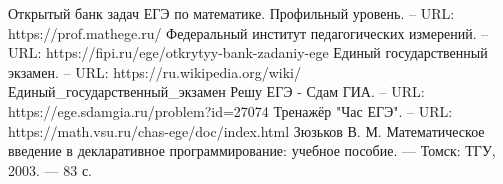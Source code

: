 \begin{thebibliography}{6}
	Открытый банк задач ЕГЭ по математике. Профильный уровень. – URL:  https://prof.mathege.ru/
	Федеральный институт педагогических измерений. – URL:  https://fipi.ru/ege/otkrytyy-bank-zadaniy-ege
	 Единый государственный экзамен. – URL:  https://ru.wikipedia.org/wiki/Единый\_государственный\_экзамен
	Решу ЕГЭ - Сдам ГИА. – URL: https://ege.sdamgia.ru/problem?id=27074
	 Тренажёр "Час ЕГЭ". – URL: https://math.vsu.ru/chas-ege/doc/index.html
	 Зюзьков В. М. Математическое введение в декларативное программирование: учебное пособие. — Томск: ТГУ, 2003. — 83 с. 
\end{thebibliography}